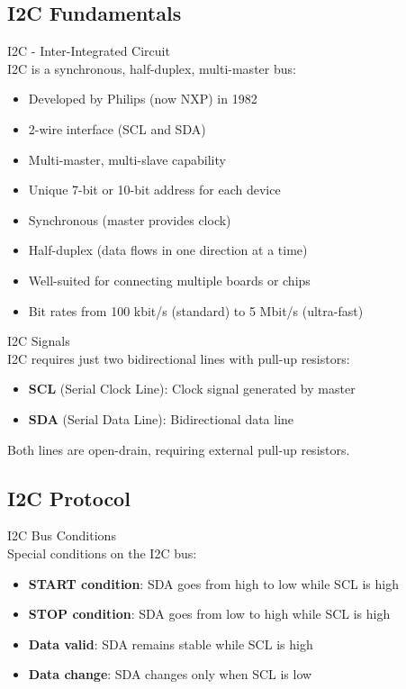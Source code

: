 \subsection{I2C Fundamentals}

\begin{concept}{I2C - Inter-Integrated Circuit}\\
I2C is a synchronous, half-duplex, multi-master bus:
\begin{itemize}
    \item Developed by Philips (now NXP) in 1982
    \item 2-wire interface (SCL and SDA)
    \item Multi-master, multi-slave capability
    \item Unique 7-bit or 10-bit address for each device
    \item Synchronous (master provides clock)
    \item Half-duplex (data flows in one direction at a time)
    \item Well-suited for connecting multiple boards or chips
    \item Bit rates from 100 kbit/s (standard) to 5 Mbit/s (ultra-fast)
\end{itemize}
\end{concept}

\begin{definition}{I2C Signals}\\
I2C requires just two bidirectional lines with pull-up resistors:
\begin{itemize}
    \item \textbf{SCL} (Serial Clock Line): Clock signal generated by master
    \item \textbf{SDA} (Serial Data Line): Bidirectional data line
\end{itemize}
Both lines are open-drain, requiring external pull-up resistors.
\end{definition}

\subsection{I2C Protocol}

\begin{concept}{I2C Bus Conditions}\\
Special conditions on the I2C bus:
\begin{itemize}
    \item \textbf{START condition}: SDA goes from high to low while SCL is high
    \item \textbf{STOP condition}: SDA goes from low to high while SCL is high
    \item \textbf{Data valid}: SDA remains stable while SCL is high
    \item \textbf{Data change}: SDA changes only when SCL is low
\end{itemize}
\end{concept}


